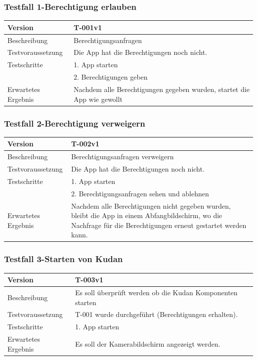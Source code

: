 \documentclass[a4paper]{scrreprt}
\begin{document}
\subsubsection{Testfall 1-Berechtigung erlauben}
\begin{tabularx}{\textwidth}{|l|X|}
\hline 
	Version &
	T-001v1 \\ 
\hline 
	Beschreibung & Berechtigungsanfragen \\ 
\hline 
	Testvoraussetzung & Die App hat die Berechtigungen noch nicht. \\ 
\hline 
	Testschritte &
		1. App starten \\ &
		2. Berechtigungen geben \\
\hline
	Erwartetes Ergebnis & Nachdem alle Berechtigungen gegeben wurden, startet die App wie gewollt \\ 
\hline 
\end{tabularx}
\subsubsection{Testfall 2-Berechtigung verweigern}
\begin{tabularx}{\textwidth}{|l|X|}
\hline 
	Version &
	T-002v1 \\ 
\hline 
	Beschreibung & Berechtigungsanfragen verweigern \\ 
\hline 
	Testvoraussetzung & Die App hat die Berechtigungen noch nicht. \\ 
\hline 
	Testschritte &
		1. App starten \\ &
		2. Berechtigungsanfragen sehen und ablehnen \\
\hline
	Erwartetes Ergebnis & Nachdem alle Berechtigungen nicht gegeben wurden, bleibt die App in einem Abfangbildschirm, wo die Nachfrage für die Berechtigungen erneut gestartet werden kann. \\ 
\hline 
\end{tabularx}
\subsubsection{Testfall 3-Starten von Kudan}
\begin{tabularx}{\textwidth}{|l|X|}
\hline 
	Version &
	T-003v1 \\ 
\hline 
	Beschreibung & 
	Es soll überprüft werden ob die Kudan Komponenten starten\\ 
\hline 
	Testvoraussetzung &
	T-001 wurde durchgeführt (Berechtigungen erhalten). \\ 
\hline 
	Testschritte &
		1. App starten \\
\hline
	Erwartetes Ergebnis &
	Es soll der Kamerabildschirm angezeigt werden. \\ 
\hline 
\end{tabularx}
\end{document}
